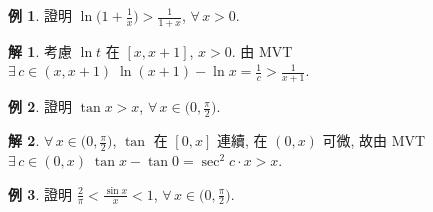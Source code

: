 \documentclass[12pt]{extarticle}
\newcommand{\ds}{\displaystyle}
\theoremstyle{definition}
\newtheorem*{ex}{例}
\newtheorem*{sol}{解}
\begin{document}
%
%
%

\begin{ex}
  證明 $\ds\ln\big(1 + \frac{1}{x}\big) > \frac{1}{1 + x}$, $\forall\,x > 0$. 
\end{ex}

\begin{sol}
  考慮 $\ds\ln t$ 在 $\ds[x, x + 1]$, $\ds x > 0$. 由 MVT $\ds\exists\,c\in(x, x + 1)\;\ln(x + 1) - \ln x = \frac{1}{c} > \frac{1}{x + 1}$. 
\end{sol}

\begin{ex}
  證明 $\ds\tan x > x$, $\ds\forall\,x\in\big(0, \frac{\pi}{2}\big)$. 
\end{ex}

\begin{sol}
  $\ds\forall\,x\in\big(0, \frac{\pi}{2}\big)$, $\ds\tan$ 在 $[0, x]$ 連續, 在 $(0, x)$ 可微, 故由 MVT $\ds\exists\,c\in(0, x)\;\tan x - \tan 0 = \sec^2 c\cdot x > x$. 
\end{sol}

\begin{ex}
  證明 $\ds\frac{2}{\pi} < \frac{\sin x}{x} < 1$, $\ds\forall\,x\in\big(0, \frac{\pi}{2}\big)$. 
\end{ex}
\end{document}
